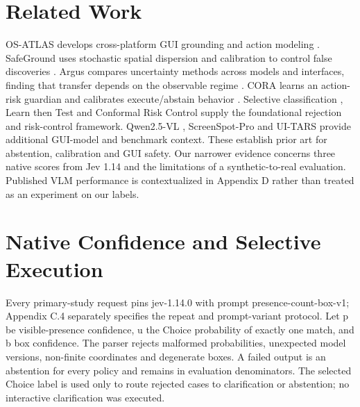 \documentclass[10pt]{article}
\begin{document}
\section{Related Work}
OS-ATLAS develops cross-platform GUI grounding and action modeling \cite{ref1}. SafeGround uses stochastic spatial dispersion and calibration to control false discoveries \cite{ref2}. Argus compares uncertainty methods across models and interfaces, finding that transfer depends on the observable regime \cite{ref3}. CORA learns an action-risk guardian and calibrates execute/abstain behavior \cite{ref4}. Selective classification \cite{ref10}, Learn then Test \cite{ref11} and Conformal Risk Control \cite{ref12} supply the foundational rejection and risk-control framework. Qwen2.5-VL \cite{ref13}, ScreenSpot-Pro \cite{ref14} and UI-TARS \cite{ref15} provide additional GUI-model and benchmark context. These establish prior art for abstention, calibration and GUI safety. Our narrower evidence concerns three native scores from Jev 1.14 and the limitations of a synthetic-to-real evaluation. Published VLM performance is contextualized in Appendix D rather than treated as an experiment on our labels.

\section{Native Confidence and Selective Execution}
Every primary-study request pins jev-1.14.0 with prompt presence-count-box-v1; Appendix C.4 separately specifies the repeat and prompt-variant protocol. Let p be visible-presence confidence, u the Choice probability of exactly one match, and b box confidence. The parser rejects malformed probabilities, unexpected model versions, non-finite coordinates and degenerate boxes. A failed output is an abstention for every policy and remains in evaluation denominators. The selected Choice label is used only to route rejected cases to clarification or abstention; no interactive clarification was executed.
\end{document}

